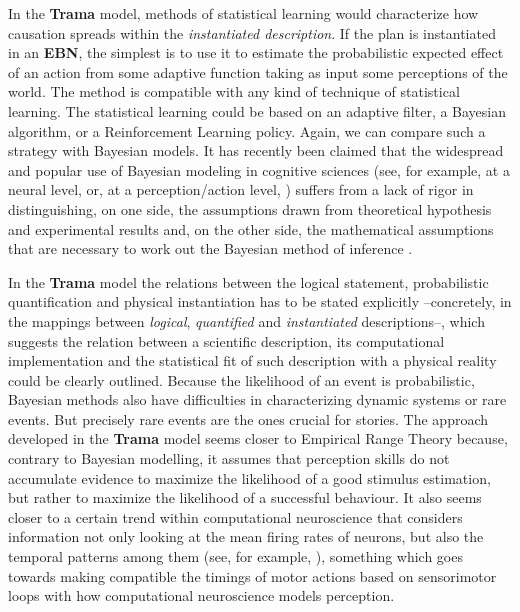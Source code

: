 \documentclass[
		twoside,openright,titlepage,numbers=noenddot,manychapters,
		headinclude,%
                footinclude=false,cleardoublepage=empty,
                BCOR=5mm,
		fontsize=11pt, %
                 enabledeprecatedfontcommands]{scrreprt}
\begin{document}
In the \textbf{Trama} model, methods of statistical learning would characterize how causation spreads within the \emph{instantiated description}. If the plan is instantiated in an \textbf{EBN}, the simplest is to use it to estimate the probabilistic expected effect of an action from some adaptive function taking as input some perceptions of the world. %
The method is compatible with any kind of technique of statistical learning. The statistical learning could be based on an adaptive filter, a Bayesian algorithm, or a Reinforcement Learning policy.  Again, we can compare such a strategy with Bayesian models. It has recently been claimed that the widespread and popular use of Bayesian modeling in cognitive sciences (see, for example, at a neural level, \cite{beck2008a}  or, at a perception/action level,  \cite{Kording2004}) suffers from a lack of rigor in distinguishing, on one side, the assumptions drawn from theoretical hypothesis and experimental results and, on the other side, the mathematical assumptions that are necessary to work out the Bayesian method of inference \cite[]{jones2011}. 

In the \textbf{Trama} model the relations between the logical statement, probabilistic quantification and physical instantiation has to be stated explicitly --concretely, in the mappings between \emph{logical}, \emph{quantified} and \emph{instantiated} descriptions--, which suggests the relation between a scientific description, its computational implementation and the statistical fit of such description with a physical reality could be clearly outlined. Because the likelihood of an event is probabilistic, Bayesian methods also have difficulties in characterizing dynamic systems or rare events. But precisely rare events are the ones crucial for stories. The approach developed in the \textbf{Trama} model seems closer to Empirical Range Theory because, contrary to Bayesian modelling, it assumes that perception skills do not accumulate evidence to maximize the likelihood of a good stimulus estimation, but rather to maximize the likelihood of a successful behaviour. It also seems closer to a certain trend within computational neuroscience that considers information not only looking at the mean firing rates of neurons, but also the temporal patterns among them (see, for example, \cite{Gutig2006}), something which goes towards making compatible the timings of motor actions based on sensorimotor loops with how computational neuroscience models perception.
\end{document}
